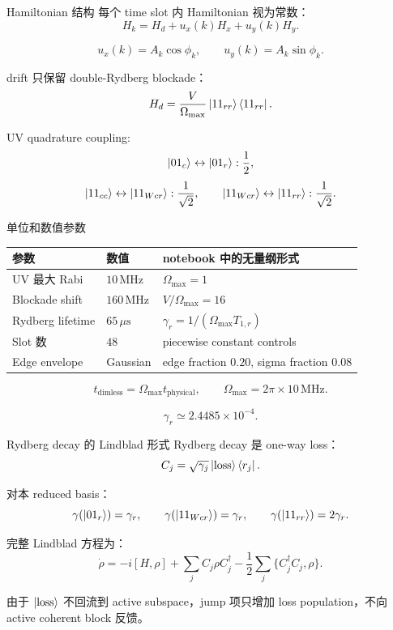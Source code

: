 \documentclass[aspectratio=169,11pt]{ctexbeamer}
\newcommand{\ketloss}{\ket{\mathrm{loss}}}
\newcommand{\OmegaMax}{\Omega_{\max}}
\begin{document}
\begin{frame}{Hamiltonian 结构}
  每个 time slot 内 Hamiltonian 视为常数：
  \[
  H_k=H_d+u_x(k)H_x+u_y(k)H_y.
  \]

  \[
  u_x(k)=A_k\cos\phi_k,\qquad
  u_y(k)=A_k\sin\phi_k.
  \]

  drift 只保留 double-Rydberg blockade：
  \[
  H_d = \frac{V}{\OmegaMax}\ket{11_{rr}}\bra{11_{rr}}.
  \]

  UV quadrature coupling:
  \[
  \ket{01_c}\leftrightarrow\ket{01_r}: \frac12,
  \]
  \[
  \ket{11_{cc}}\leftrightarrow\ket{11_{Wcr}}: \frac{1}{\sqrt2},
  \qquad
  \ket{11_{Wcr}}\leftrightarrow\ket{11_{rr}}: \frac{1}{\sqrt2}.
  \]
\end{frame}

\begin{frame}{单位和数值参数}
  \begin{table}
    \centering
    \begin{tabular}{lll}
      \toprule
      参数 & 数值 & notebook 中的无量纲形式 \\
      \midrule
      UV 最大 Rabi & \(10\,\mathrm{MHz}\) & \(\OmegaMax=1\) \\
      Blockade shift & \(160\,\mathrm{MHz}\) & \(V/\OmegaMax=16\) \\
      Rydberg lifetime & \(65\,\mu\mathrm{s}\) &
      \(\gamma_r=1/(\OmegaMax T_{1,r})\) \\
      Slot 数 & \(48\) & piecewise constant controls \\
      Edge envelope & Gaussian & edge fraction \(0.20\), sigma fraction \(0.08\) \\
      \bottomrule
    \end{tabular}
  \end{table}

  \[
  t_{\mathrm{dimless}}=\OmegaMax t_{\mathrm{physical}},
  \qquad
  \OmegaMax=2\pi\times 10\,\mathrm{MHz}.
  \]

  \[
  \gamma_r \simeq 2.4485\times 10^{-4}.
  \]
\end{frame}

\begin{frame}{Rydberg decay 的 Lindblad 形式}
  Rydberg decay 是 one-way loss：
  \[
  C_j=\sqrt{\gamma_j}\ketloss\bra{r_j}.
  \]

  对本 reduced basis：
  \[
  \gamma(\ket{01_r})=\gamma_r,\qquad
  \gamma(\ket{11_{Wcr}})=\gamma_r,\qquad
  \gamma(\ket{11_{rr}})=2\gamma_r.
  \]

  完整 Lindblad 方程为：
  \[
  \dot\rho=-i[H,\rho]
  +\sum_j C_j\rho C_j^\dagger
  -\frac12\sum_j\{C_j^\dagger C_j,\rho\}.
  \]

  由于 \(\ketloss\) 不回流到 active subspace，jump 项只增加 loss population，不向 active coherent block 反馈。
\end{frame}
\end{document}
